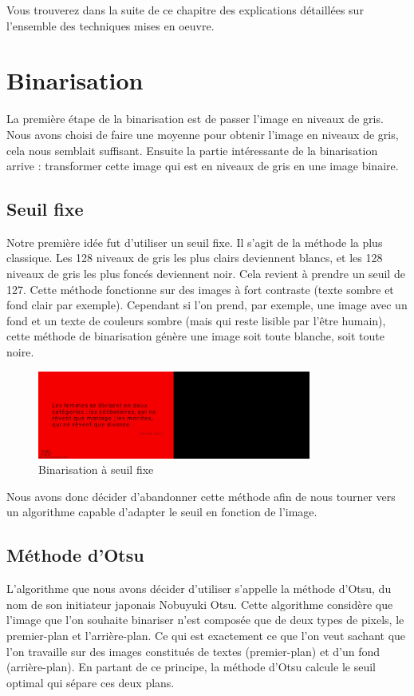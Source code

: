 \documentclass[11pt]{report}
\begin{document}
Vous trouverez dans la suite de ce chapitre des explications détaillées sur l'ensemble des techniques mises en oeuvre.

\section{Binarisation}

La première étape de la binarisation est de passer l’image en niveaux de gris. Nous avons choisi de faire une moyenne pour obtenir l’image en niveaux de gris, cela nous semblait suffisant. Ensuite la partie intéressante de la binarisation arrive : transformer cette image qui est en niveaux de gris en une image binaire.

\subsection{Seuil fixe}

Notre première idée fut d'utiliser un seuil fixe. Il s'agit de la méthode la plus classique. Les 128 niveaux de gris les plus clairs deviennent blancs, et les 128 niveaux de gris les plus foncés deviennent noir. Cela revient à prendre un seuil de 127. Cette méthode fonctionne sur des images à fort contraste (texte sombre et fond clair par exemple). Cependant si l'on prend, par exemple, une image avec un fond et un texte de couleurs sombre (mais qui reste lisible par l’être humain), cette méthode de binarisation génère une image soit toute blanche, soit toute noire.

\begin{figure}[htbp]
\centering
\includegraphics[width=9cm]{b_fixed.png}
\caption{Binarisation à seuil fixe}
\end{figure}

Nous avons donc décider d'abandonner cette méthode afin de nous tourner vers un algorithme capable d'adapter le seuil en fonction de l'image.

\subsection{Méthode d'Otsu}

L'algorithme que nous avons décider d'utiliser s'appelle la méthode d'Otsu, du nom de son initiateur japonais Nobuyuki Otsu. Cette algorithme considère que l’image que l’on souhaite binariser n’est composée que de deux types de pixels, le premier-plan et l’arrière-plan. Ce qui est exactement ce que l’on veut sachant que l’on travaille sur des images constitués de textes (premier-plan) et d’un fond (arrière-plan). En partant de ce principe, la méthode d'Otsu calcule le seuil optimal qui sépare ces deux plans.
\end{document}
